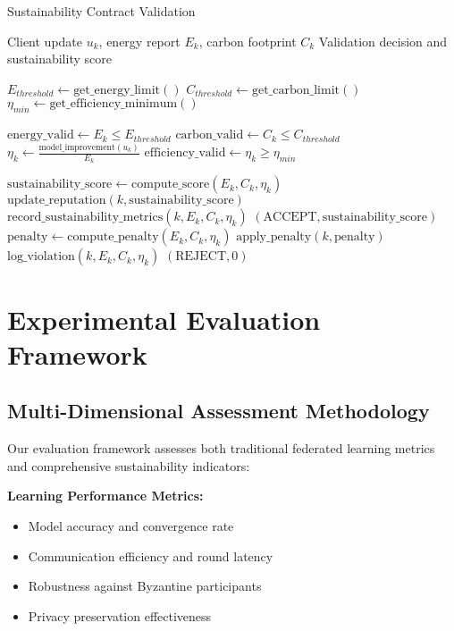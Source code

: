 \documentclass[10pt,journal,compsoc]{IEEEtran}
\begin{document}
\begin{algorithm}[!t]
\caption{Sustainability Contract Validation}
\label{alg:sustainability_contract}
\begin{algorithmic}[1]
\Require Client update $u_k$, energy report $E_k$, carbon footprint $C_k$
\Ensure Validation decision and sustainability score

\State $E_{threshold} \leftarrow \text{get\_energy\_limit}()$
\State $C_{threshold} \leftarrow \text{get\_carbon\_limit}()$
\State $\eta_{min} \leftarrow \text{get\_efficiency\_minimum}()$

\State $\text{energy\_valid} \leftarrow E_k \leq E_{threshold}$
\State $\text{carbon\_valid} \leftarrow C_k \leq C_{threshold}$
\State $\eta_k \leftarrow \frac{\text{model\_improvement}(u_k)}{E_k}$
\State $\text{efficiency\_valid} \leftarrow \eta_k \geq \eta_{min}$

    \State $\text{sustainability\_score} \leftarrow \text{compute\_score}(E_k, C_k, \eta_k)$
    \State $\text{update\_reputation}(k, \text{sustainability\_score})$
    \State $\text{record\_sustainability\_metrics}(k, E_k, C_k, \eta_k)$
    \State \Return $(\text{ACCEPT}, \text{sustainability\_score})$
\Else
    \State $\text{penalty} \leftarrow \text{compute\_penalty}(E_k, C_k, \eta_k)$
    \State $\text{apply\_penalty}(k, \text{penalty})$
    \State $\text{log\_violation}(k, E_k, C_k, \eta_k)$
    \State \Return $(\text{REJECT}, 0)$
\EndIf
\end{algorithmic}
\end{algorithm}

\section{Experimental Evaluation Framework}

\subsection{Multi-Dimensional Assessment Methodology}

Our evaluation framework assesses both traditional federated learning metrics and comprehensive sustainability indicators:

\textbf{Learning Performance Metrics:}
\begin{itemize}
\item Model accuracy and convergence rate
\item Communication efficiency and round latency
\item Robustness against Byzantine participants
\item Privacy preservation effectiveness
\end{itemize}
\end{document}
